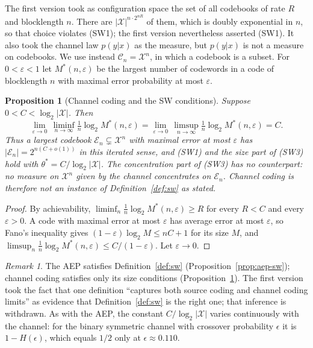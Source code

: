 \documentclass[12pt]{amsart}
\theoremstyle{plain}
\newtheorem{proposition}[theorem]{Proposition}
\theoremstyle{definition}
\theoremstyle{remark}
\newtheorem{remark}[theorem]{Remark}
\begin{document}
The first version took as configuration space the set of all codebooks of rate
$R$ and blocklength $n$. There are $|\mathcal{X}|^{n \cdot 2^{nR}}$ of them, which
is doubly exponential in $n$, so that choice violates (SW1); the first version
nevertheless asserted (SW1). It also took the channel law $p(y|x)$ as the
measure, but $p(y|x)$ is not a measure on codebooks. We use instead
$\mathcal{C}_n = \mathcal{X}^n$, in which a codebook is a subset. For
$0 < \varepsilon < 1$ let $M^*(n,\varepsilon)$ be the largest number of codewords
in a code of blocklength $n$ with maximal error probability at most $\varepsilon$.

\begin{proposition}[Channel coding and the SW conditions]
\label{prop:channel-sw}
Suppose $0 < C < \log_2|\mathcal{X}|$. Then
\[
  \lim_{\varepsilon \to 0}\, \liminf_{n \to \infty} \tfrac{1}{n}\log_2
  M^*(n,\varepsilon)
  = \lim_{\varepsilon \to 0}\, \limsup_{n \to \infty} \tfrac{1}{n}\log_2
  M^*(n,\varepsilon) = C.
\]
Thus a largest codebook $\mathcal{E}_n \subsetneq \mathcal{X}^n$ with maximal
error at most $\varepsilon$ has $|\mathcal{E}_n| = 2^{n(C+o(1))}$ in this iterated
sense, and (SW1) and the size part of (SW3) hold with
$\theta^* = C/\log_2|\mathcal{X}|$. The concentration part of (SW3) has no
counterpart: no measure on $\mathcal{X}^n$ given by the channel concentrates on
$\mathcal{E}_n$. Channel coding is therefore not an instance of
Definition~\ref{def:sw} as stated.
\end{proposition}

\begin{proof}
By achievability, $\liminf_n \frac{1}{n}\log_2 M^*(n,\varepsilon) \geq R$ for
every $R < C$ and every $\varepsilon > 0$. A code with maximal error at most
$\varepsilon$ has average error at most $\varepsilon$, so Fano's inequality gives
$(1-\varepsilon)\log_2 M \leq nC + 1$ for its size $M$, and
$\limsup_n \frac{1}{n}\log_2 M^*(n,\varepsilon) \leq C/(1-\varepsilon)$. Let
$\varepsilon \to 0$.
\end{proof}

\begin{remark}
\label{rem:two-shannon}
The AEP satisfies Definition~\ref{def:sw} (Proposition~\ref{prop:aep-sw});
channel coding satisfies only its size conditions
(Proposition~\ref{prop:channel-sw}). The first version took the fact that one
definition ``captures both source coding and channel coding limits'' as evidence
that Definition~\ref{def:sw} is the right one; that inference is withdrawn. As
with the AEP, the constant $C/\log_2|\mathcal{X}|$ varies continuously with the
channel: for the binary symmetric channel with crossover probability $\epsilon$
it is $1 - H(\epsilon)$, which equals $1/2$ only at $\epsilon \approx 0.110$.
\end{remark}
\end{document}
